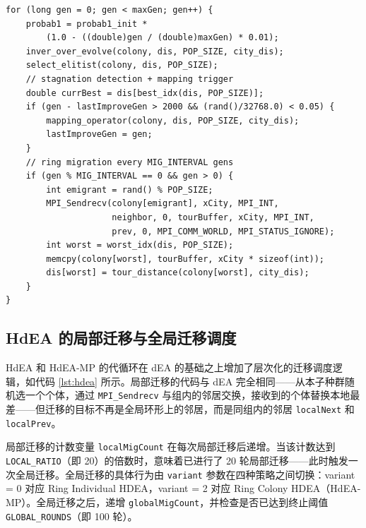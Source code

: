 \begin{lstlisting}[caption={dEA 代循环核心（Inver-over + 停滞检测 + Ring 迁移）},label={lst:dea}]
for (long gen = 0; gen < maxGen; gen++) {
    probab1 = probab1_init *
        (1.0 - ((double)gen / (double)maxGen) * 0.01);
    inver_over_evolve(colony, dis, POP_SIZE, city_dis);
    select_elitist(colony, dis, POP_SIZE);
    // stagnation detection + mapping trigger
    double currBest = dis[best_idx(dis, POP_SIZE)];
    if (gen - lastImproveGen > 2000 && (rand()/32768.0) < 0.05) {
        mapping_operator(colony, dis, POP_SIZE, city_dis);
        lastImproveGen = gen;
    }
    // ring migration every MIG_INTERVAL gens
    if (gen % MIG_INTERVAL == 0 && gen > 0) {
        int emigrant = rand() % POP_SIZE;
        MPI_Sendrecv(colony[emigrant], xCity, MPI_INT,
                     neighbor, 0, tourBuffer, xCity, MPI_INT,
                     prev, 0, MPI_COMM_WORLD, MPI_STATUS_IGNORE);
        int worst = worst_idx(dis, POP_SIZE);
        memcpy(colony[worst], tourBuffer, xCity * sizeof(int));
        dis[worst] = tour_distance(colony[worst], city_dis);
    }
}
\end{lstlisting}

\subsection{HdEA 的局部迁移与全局迁移调度}

HdEA 和 HdEA-MP 的代循环在 dEA 的基础之上增加了层次化的迁移调度逻辑，如代码 \ref{lst:hdea} 所示。局部迁移的代码与 dEA 完全相同——从本子种群随机选一个个体，通过 \texttt{MPI\_Sendrecv} 与组内的邻居交换，接收到的个体替换本地最差——但迁移的目标不再是全局环形上的邻居，而是同组内的邻居 \texttt{localNext} 和 \texttt{localPrev}。

局部迁移的计数变量 \texttt{localMigCount} 在每次局部迁移后递增。当该计数达到 \texttt{LOCAL\_RATIO}（即 20）的倍数时，意味着已进行了 20 轮局部迁移——此时触发一次全局迁移。全局迁移的具体行为由 \texttt{variant} 参数在四种策略之间切换：variant = 0 对应 Ring Individual HDEA，variant = 2 对应 Ring Colony HDEA（HdEA-MP）。全局迁移之后，递增 \texttt{globalMigCount}，并检查是否已达到终止阈值 \texttt{GLOBAL\_ROUNDS}（即 100 轮）。

